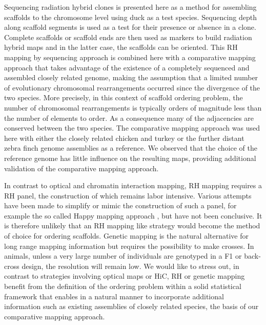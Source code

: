 \documentclass[10pt,letterpaper]{article}
\begin{document}
Sequencing radiation hybrid clones is presented here as a method for assembling scaffolds to the chromosome level using duck as a test species. 
Sequencing depth along scaffold segments is used as a test for their presence or absence in a clone. 
Complete scaffolds or scaffold ends are then used as markers to build radiation hybrid maps and in the latter case, the scaffolds can be oriented. 
This RH mapping by sequencing approach is combined here with a comparative mapping approach \cite{Faraut2007} that takes advantage of the existence of a completely sequenced and assembled closely related genome, making the assumption that a limited number of evolutionary chromosomal rearrangements occurred since the divergence of the two species. 
More precisely, in this context of scaffold ordering problem, the number of chromosomal rearrangements is typically orders of magnitude less than the number of elements to order. As a consequence many of the adjacencies are conserved between the two species. 
The comparative mapping approach was used here with either the closely related chicken and turkey or the further distant zebra finch genome assemblies as a reference. We observed that the choice of the reference genome has little influence on the resulting maps, providing additional validation of the comparative mapping approach.

In contrast to optical and chromatin interaction mapping, RH mapping requires a RH panel, the construction of which remains labor intensive. Various attempts have been made to simplify or mimic the construction of such a panel, for example the so called Happy mapping approach \cite{Dear1993a}, but have not been conclusive. It is therefore unlikely that an RH mapping like strategy would become the method of choice for ordering scaffolds. Genetic mapping is the natural alternative for long range mapping information but requires the possibility to make crosses. In animals, unless a very large number of individuals are genotyped in a F1 or back-cross design, the resolution will remain low. 
We would like to stress out, in contrast to strategies involving optical maps or HiC, RH or genetic mapping benefit from the definition of the ordering problem within a solid statistical framework that enables in a natural manner to incorporate additional information such as existing assemblies of closely related species, the basis of our comparative mapping approach. 
\end{document}
